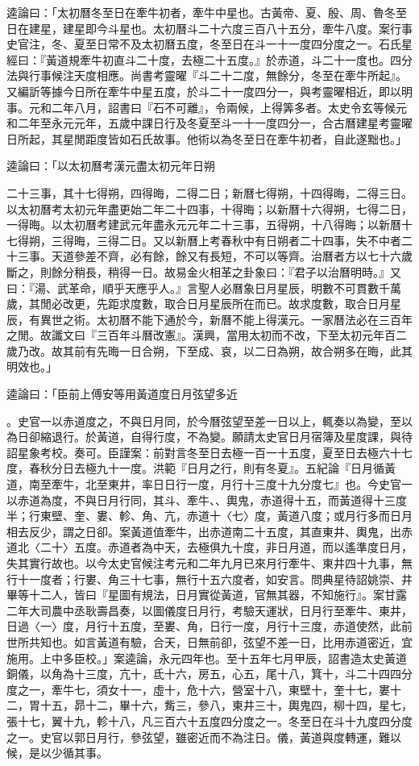 \begin{pinyinscope}
逵論曰：「太初曆冬至日在牽牛初者，牽牛中星也。古黃帝、夏、殷、周、魯冬至日在建星，建星即今斗星也。太初曆斗二十六度三百八十五分，牽牛八度。案行事史官注，冬、夏至日常不及太初曆五度，冬至日在斗一十一度四分度之一。石氏星經曰：『黃道規牽牛初直斗二十度，去極二十五度。』於赤道，斗二十一度也。四分法與行事候注天度相應。尚書考靈曜『斗二十二度，無餘分，冬至在牽牛所起』。又編訢等據今日所在牽牛中星五度，於斗二十一度四分一，與考靈曜相近，即以明事。元和二年八月，詔書曰『石不可離』，令兩候，上得筭多者。太史令玄等候元和二年至永元元年，五歲中課日行及冬夏至斗一十一度四分一，合古曆建星考靈曜日所起，其星閒距度皆如石氏故事。他術以為冬至日在牽牛初者，自此遂黜也。」

逵論曰：「以太初曆考漢元盡太初元年日朔

二十三事，其十七得朔，四得晦，二得二日；新曆七得朔，十四得晦，二得三日。以太初曆考太初元年盡更始二年二十四事，十得晦；以新曆十六得朔，七得二日，一得晦。以太初曆考建武元年盡永元元年二十三事，五得朔，十八得晦；以新曆十七得朔，三得晦，三得二日。又以新曆上考春秋中有日朔者二十四事，失不中者二十三事。天道參差不齊，必有餘，餘又有長短，不可以等齊。治曆者方以七十六歲斷之，則餘分稍長，稍得一日。故易金火相革之卦象曰：『君子以治曆明時。』又曰：『湯、武革命，順乎天應乎人。』言聖人必曆象日月星辰，明數不可貫數千萬歲，其閒必改更，先距求度數，取合日月星辰所在而已。故求度數，取合日月星辰，有異世之術。太初曆不能下通於今，新曆不能上得漢元。一家曆法必在三百年之閒。故讖文曰『三百年斗曆改憲』。漢興，當用太初而不改，下至太初元年百二歲乃改。故其前有先晦一日合朔，下至成、哀，以二日為朔，故合朔多在晦，此其明效也。」

逵論曰：「臣前上傅安等用黃道度日月弦望多近

。史官一以赤道度之，不與日月同，於今曆弦望至差一日以上，輒奏以為變，至以為日卻縮退行。於黃道，自得行度，不為變。願請太史官日月宿簿及星度課，與待詔星象考校。奏可。臣謹案：前對言冬至日去極一百一十五度，夏至日去極六十七度，春秋分日去極九十一度。洪範『日月之行，則有冬夏』。五紀論『日月循黃道，南至牽牛，北至東井，率日日行一度，月行十三度十九分度七』也。今史官一以赤道為度，不與日月行同，其斗、牽牛、、輿鬼，赤道得十五，而黃道得十三度半；行東壁、奎、婁、軫、角、亢，赤道十〈七〉度，黃道八度；或月行多而日月相去反少，謂之日卻。案黃道值牽牛，出赤道南二十五度，其直東井、輿鬼，出赤道北〈二十〉五度。赤道者為中天，去極俱九十度，非日月道，而以遙準度日月，失其實行故也。以今太史官候注考元和二年九月已來月行牽牛、東井四十九事，無行十一度者；行婁、角三十七事，無行十五六度者，如安言。問典星待詔姚崇、井畢等十二人，皆曰『星圖有規法，日月實從黃道，官無其器，不知施行』。案甘露二年大司農中丞耿壽昌奏，以圖儀度日月行，考驗天運狀，日月行至牽牛、東井，日過〈一〉度，月行十五度，至婁、角，日行一度，月行十三度，赤道使然，此前世所共知也。如言黃道有驗，合天，日無前卻，弦望不差一日，比用赤道密近，宜施用。上中多臣校。」案逵論，永元四年也。至十五年七月甲辰，詔書造太史黃道銅儀，以角為十三度，亢十，氐十六，房五，心五，尾十八，箕十，斗二十四四分度之一，牽牛七，須女十一，虛十，危十六，營室十八，東壁十，奎十七，婁十二，胃十五，昴十二，畢十六，觜三，參八，東井三十，輿鬼四，柳十四，星七，張十七，翼十九，軫十八，凡三百六十五度四分度之一。冬至日在斗十九度四分度之一。史官以郭日月行，參弦望，雖密近而不為注日。儀，黃道與度轉運，難以候，是以少循其事。


\end{pinyinscope}
